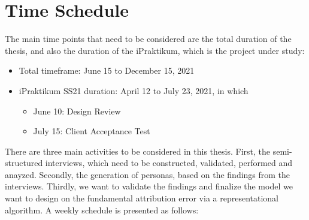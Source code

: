 \documentclass[a4paper]{article}
\begin{document}
\section*{Time Schedule}

The main time points that need to be considered are the total duration of the thesis, and also the duration of the  iPraktikum, which is the project under study:

\begin{itemize}
	\item Total timeframe: June 15 to December 15, 2021
	\item iPraktikum SS21 duration: April 12 to July 23, 2021, in which
	\begin{itemize}
	\item June 10: Design Review
	\item July 15: Client Acceptance Test
	\end{itemize}
\end{itemize}

There are three main activities to be considered in this thesis. First, the semi-structured interviews, which need to be constructed, validated, performed and anayzed. Secondly, the generation of personas, based on the findings from the interviews. Thirdly, we want to validate the findings and finalize the model we want to design on the fundamental attribution error via a representational algorithm. A weekly schedule is presented as follows:
\end{document}
